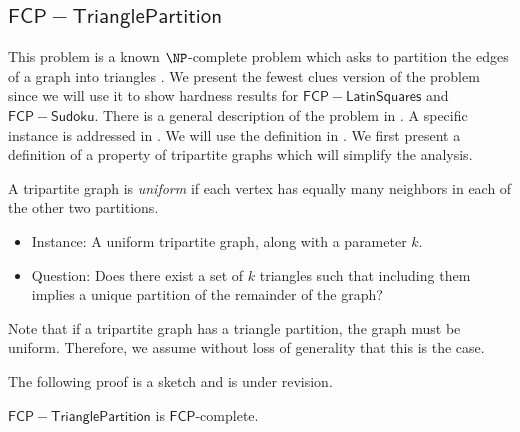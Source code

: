 \documentclass[runningheads,a4paper]{llncs}
\begin{document}
\subsection{$\mathsf{FCP-Triangle Partition}$}

This problem is a known $\NP$-complete problem which asks to partition the edges of a graph into triangles \cite{holyer1981np}. We present the fewest clues version of the problem since we will use it to show hardness results for $\mathsf{FCP-Latin Squares}$ and $\mathsf{FCP-Sudoku}$. There is a general description of the problem in \cite{holyer1981np}. A specific instance is addressed in \cite{colbourn1984complexity}. We will use the definition in \cite{colbourn1984complexity}. We first present a definition of a property of tripartite graphs which will simplify the analysis.

\begin{definition}
A tripartite graph is \emph{uniform} if each vertex has equally many neighbors in each of the other two partitions.
\end{definition}

\begin{itemize}
\item Instance: A uniform tripartite graph, along with a parameter $k$.
\item Question: Does there exist a set of $k$ triangles such that including them implies a unique partition of the remainder of the graph?
\end{itemize}

Note that if a tripartite graph has a triangle partition, the graph must be uniform. Therefore, we assume without loss of generality that this is the case. 

The following proof is a sketch and is under revision.

\begin{theorem}
$\mathsf{FCP-Triangle Partition}$ is $\mathsf{FCP}$-complete.
\end{theorem}
\end{document}
